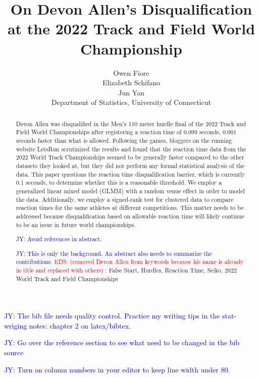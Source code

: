 \documentclass[12pt, letterpaper, titlepage]{article}
\title{On Devon Allen's Disqualification at the 2022 Track and Field World
Championship}
\author{Owen Fiore\\
  Elizabeth Schifano\\
  Jun Yan\\[1ex]
  Department of Statistics, University of Connecticut\\
}
\date{}
\newcommand{\jy}[1]{\textcolor{blue}{JY: #1}}
\newcommand{\eds}[1]{\textcolor{red}{EDS: (#1)}}
\begin{document}
\maketitle

\begin{abstract}
Devon Allen was disqualified in the Men's 110 meter hurdle final of the 2022
Track and Field World Championships after registering a reaction time of 0.099 
seconds, 0.001 seconds faster than what is allowed. Following the games, 
bloggers on the running website LetsRun scrutinized the results %
and found that the reaction time data from the 2022 World Track Championships 
seemed to be generally faster compared to the other datasets they looked at, but 
they did not perform any formal %
statistical analysis of the data. This paper questions the reaction time 
disqualification barrier, which is currently 0.1 seconds, to determine whether 
this is a reasonable threshold. We employ a generalized linear mixed model 
(GLMM) with a random %
venue effect in order to %
model the data. Additionally, we employ a signed-rank test for clustered data to 
compare reaction times for the same athletes at different competitions. This 
matter needs to be addressed because %
disqualification based on allowable reaction time 
will likely continue to be an issue in future world championships.

\jy{Avoid references in abstract.}

  
\jy{This is only the background. An abstract also needs to summarize the 
contributions.}
\eds{removed Devon Allen from keywords because his name is already in title
and replaced with others}
\noindent{}:
False Start, Hurdles, Reaction Time, Seiko, 2022 World Track and Field Championships 

\end{abstract}

\doublespace

\jy{The bib file needs quality control. Practice my writing tips in the
  stat-wriging notes: chapter 2 on latex/bibtex.}

\jy{Go over the reference section to see what need to be changed in the bib source}

\jy{Turn on column numbers in your editor to keep line width under 80.}
\end{document}
